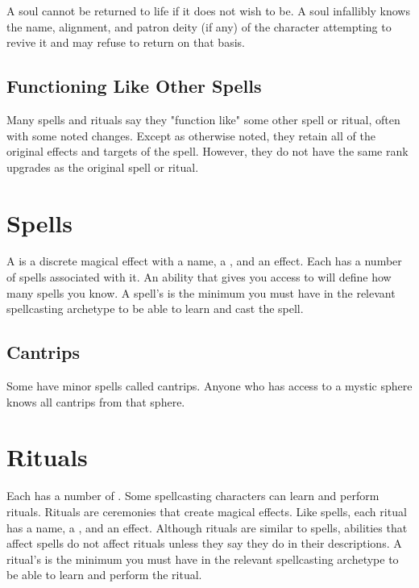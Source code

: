          A soul cannot be returned to life if it does not wish to be.
        A soul infallibly knows the name, alignment, and patron deity (if any) of the character attempting to revive it and may refuse to return on that basis.

    \subsection{Functioning Like Other Spells}\label{Functioning Like Other Spells}
        Many spells and rituals say they "function like" some other spell or ritual, often with some noted changes.
        Except as otherwise noted, they retain all of the original effects and targets of the spell.
        However, they do not have the same rank upgrades as the original spell or ritual.

\section{Spells}\label{Spells}
    A  is a discrete magical effect with a name, a , and an effect.
    Each  has a number of spells associated with it.
    An ability that gives you access to  will define how many spells you know.
    A spell's  is the minimum  you must have in the relevant spellcasting archetype to be able to learn and cast the spell.

    \subsection{Cantrips}\label{Cantrips}
        Some  have minor spells called cantrips.
        Anyone who has access to a mystic sphere knows all cantrips from that sphere.

\section{Rituals}\label{Rituals}
    Each  has a number of .
    Some spellcasting characters can learn and perform rituals.
    Rituals are ceremonies that create magical effects.
    Like spells, each ritual has a name, a , and an effect.
    Although rituals are similar to spells, abilities that affect spells do not affect rituals unless they say they do in their descriptions.
    A ritual's  is the minimum  you must have in the relevant spellcasting archetype to be able to learn and perform the ritual.

